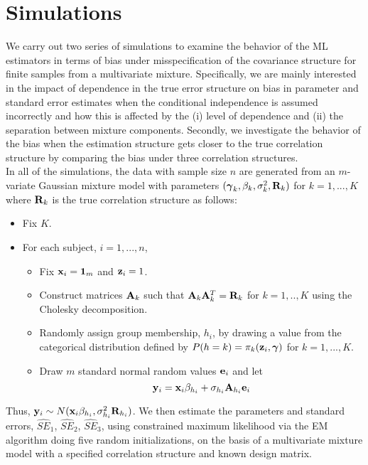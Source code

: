  \section{Simulations}
We carry out two series of simulations to examine the behavior of the ML estimators in terms of bias under misspecification of the covariance structure for finite samples from a multivariate mixture. Specifically, we are mainly interested in the impact of dependence in the true error structure on bias in parameter and standard error estimates when the conditional independence is assumed incorrectly and how this is affected by the (i) level of dependence and (ii) the separation between mixture components. Secondly, we investigate the behavior of the bias when the estimation structure gets closer to the true correlation structure by comparing the bias under three correlation structures.\\

In all of the simulations, the data with sample size $n$ are generated from an $m$-variate Gaussian mixture model with parameters $(\boldsymbol\gamma_{k},\beta_{k},\sigma^{2}_{k},\mathbf R_k)$ for $k=1,...,K$ where $\mathbf R_k$ is the true correlation structure as follows:
\begin{itemize}
\item Fix $K$. 
\item For each subject, $i=1,...,n$, 
\begin{itemize}
\item Fix $\mathbf x_{i} = \mathbf 1_{m}$ and $\mathbf z_{i}=1$.
\item Construct matrices $\mathbf A_k$ such that $\mathbf A_k\mathbf A_k^{T}=\mathbf R_k$ for $k=1,..,K$ using the Cholesky decomposition. 
\item Randomly assign group membership, $h_{i}$, by drawing a value from the categorical distribution defined by $P(h=k)=\pi_{k}(\mathbf z_{i},\boldsymbol\gamma)$ for $k=1,...,K$. 
\item Draw $m$ standard normal random values $\mathbf e_{i}$ and let
$$\mathbf y_{i}=\mathbf x_{i}\beta_{h_{i}}+\sigma_{h_{i}}\mathbf A_{h_{i}}\mathbf e_{i}$$
\end{itemize}
\end{itemize}
Thus, $\mathbf y_{i}\sim N(\mathbf x_{i}\beta_{h_{i}},\sigma_{h_{i}}^{2}\mathbf R_{h_{i}})$. We then estimate the parameters and standard errors, $\widehat{SE}_1$, $\widehat{SE}_2$, $\widehat{SE}_3$, using constrained maximum likelihood via the EM algorithm \cite{hathaway1985} doing five random initializations, on the basis of a multivariate mixture model with a specified correlation structure and known design matrix.\\

